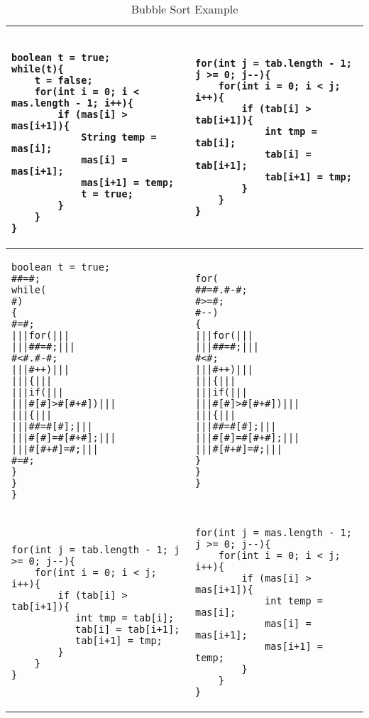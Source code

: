 \begin{table*}[]
\centering
\caption{Bubble Sort Example}
\label{tab:bubble}
\begin{tabular}{l|l}

\hline

\begin{lstlisting}[moredelim={[is][\color{red}]{|||}{|||}}]

boolean t = true;
while(t){
    t = false;
    for(int i = 0; i < mas.length - 1; i++){
        if (mas[i] > mas[i+1]){
            String temp = mas[i];
            mas[i] = mas[i+1];
            mas[i+1] = temp;
            t = true;
        }
    }
}
\end{lstlisting}&
\begin{lstlisting}[moredelim={[is][\color{red}]{|||}{|||}}]
for(int j = tab.length - 1; j >= 0; j--){
    for(int i = 0; i < j; i++){
        if (tab[i] > tab[i+1]){
            int tmp = tab[i];
            tab[i] = tab[i+1];
            tab[i+1] = tmp;
        }
    }
}
\end{lstlisting}
\\ \hline
\begin{lstlisting}[moredelim={[is][\color{red}]{|||}{|||}}]
boolean t = true;
##=#;
while(
#)
{
#=#;
|||for(|||
|||##=#;|||
#<#.#-#;
|||#++)|||
|||{|||
|||if(|||
|||#[#]>#[#+#])|||
|||{|||
|||##=#[#];|||
|||#[#]=#[#+#];|||
|||#[#+#]=#;|||
#=#;
}
}
}
\end{lstlisting}&
\begin{lstlisting}[moredelim={[is][\color{red}]{|||}{|||}}]
for(
##=#.#-#;
#>=#;
#--)
{
|||for(|||
|||##=#;|||
#<#;
|||#++)|||
|||{|||
|||if(|||
|||#[#]>#[#+#])|||
|||{|||
|||##=#[#];|||
|||#[#]=#[#+#];|||
|||#[#+#]=#;|||
}
}
}
\end{lstlisting}
\\ \hline
\begin{lstlisting}[moredelim={[is][\color{red}]{|||}{|||}}]
for(int j = tab.length - 1; j >= 0; j--){
    for(int i = 0; i < j; i++){
        if (tab[i] > tab[i+1]){
           int tmp = tab[i];
           tab[i] = tab[i+1];
           tab[i+1] = tmp;
        }
    }
}
\end{lstlisting}&
\begin{lstlisting}[moredelim={[is][\color{red}]{|||}{|||}}]
for(int j = mas.length - 1; j >= 0; j--){
    for(int i = 0; i < j; i++){
        if (mas[i] > mas[i+1]){
            int temp = mas[i];
            mas[i] = mas[i+1];
            mas[i+1] = temp;
        }
    }
}
\end{lstlisting}
\end{tabular}
\end{table*}

